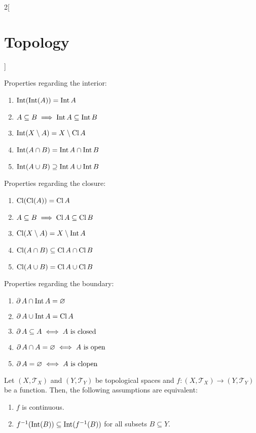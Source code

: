 \documentclass[../../../main.tex]{subfiles}
\begin{document}
\begin{multicols}{2}[\section{Topology}]
\begin{prop}
    Properties regarding the interior:
    \begin{enumerate}[leftmargin=1.15cm]\renewcommand{\labelenumi}{1.\arabic{enumi}.}
      \item $\operatorname{Int}(\operatorname{Int} (A))=         \operatorname{Int} A$
      \item $A\subseteq B\implies    \operatorname{Int} A\subseteq\operatorname{Int} B$
      \item $\operatorname{Int}(X\setminus A)=     X\setminus \operatorname{Cl} A$
      \item $\operatorname{Int}(A\cap B)=          \operatorname{Int} A\cap\operatorname{Int} B$
      \item $\operatorname{Int}(A\cup B)\supseteq  \operatorname{Int} A\cup\operatorname{Int} B$
    \end{enumerate}
    Properties regarding the closure:
    \begin{enumerate}[leftmargin=1.15cm]\renewcommand{\labelenumi}{2.\arabic{enumi}.}
      \item $\operatorname{Cl}(\operatorname{Cl} (A))=          \operatorname{Cl} A$
      \item $A\subseteq B\implies   \operatorname{Cl} A\subseteq\operatorname{Cl} B$
      \item $\operatorname{Cl}(X\setminus A)=     X\setminus \operatorname{Int} A$
      \item $\operatorname{Cl}(A\cap B)\subseteq  \operatorname{Cl} A\cap\operatorname{Cl} B$
      \item $\operatorname{Cl}(A\cup B)=          \operatorname{Cl} A\cup\operatorname{Cl} B$
    \end{enumerate}
    Properties regarding the boundary:
    \begin{enumerate}[leftmargin=1.15cm]\renewcommand{\labelenumi}{3.\arabic{enumi}.}
      \item $\operatorname{\partial} A\cap\operatorname{Int} A=         \varnothing$
      \item $\operatorname{\partial} A\cup\operatorname{Int} A=             \operatorname{Cl} A$
      \item $\operatorname{\partial} A\subseteq A\iff  A  \text{ is closed}$
      \item $\operatorname{\partial} A\cap A=\varnothing\iff  A\text{ is open}$
      \item $\operatorname{\partial} A=\varnothing\iff\text{$A$ is clopen}$
    \end{enumerate}
  \end{prop}
  \begin{theorem}
    Let $(X,\mathcal{T}_X)$ and $(Y,\mathcal{T}_Y)$ be topological spaces and $f:(X,\mathcal{T}_X)\rightarrow (Y,\mathcal{T}_Y)$ be a function. Then, the following assumptions are equivalent:
    \begin{enumerate}
      \item $f$ is continuous.
      \item $f^{-1}(\operatorname{Int}(B))\subseteq \operatorname{Int}(f^{-1}(B))$ for all subsets $B\subseteq Y$.

\end{enumerate}
\end{theorem}
\end{multicols}
\end{document}
